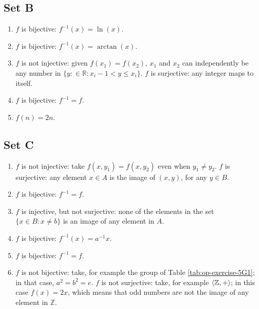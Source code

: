 \subsection{Set B}
\begin{enumerate}
    \item $f$ is bijective: $f^{-1}(x) = \ln(x)$.

    \item $f$ is bijective: $f^{-1}(x) = \arctan(x)$.

    \item $f$ is not injective: given $f(x_1) = f(x_2)$, $x_1$ and $x_2$ can independently be any number in $\{y: \in \mathbb{R}: x_i - 1 < y \leqslant x_i\}$. $f$ is surjective: any integer maps to itself.

    \item $f$ is bijective: $f^{-1} = f$.

    \item $f(n) = 2n$.
\end{enumerate}

\subsection{Set C}
\begin{enumerate}
    \item $f$ is not injective: take $f(x, y_1) = f(x, y_2)$ even when $y_1 \ne y_2$. $f$ is surjective: any element $x \in A$ is the image of $(x, y)$, for any $y \in B$.

    \item $f$ is bijective: $f^{-1} = f$.

    \item $f$ is injective, but not surjective: none of the elements in the set $\{x \in B: x \ne b\}$ is an image of any element in $A$.

    \item $f$ is bijective: $f^{-1}(x) = a^{-1}x$.

    \item $f$ is bijective: $f^{-1} = f$.

    \item $f$ is not bijective: take, for example the group of Table \ref{tab:op-exercise-5G1}; in that case, $a^2 = b^2 = e$. $f$ is not surjective: take, for example $\langle\mathbb{Z}, +\rangle$; in this case $f(x) = 2x$, which means that odd numbers are not the image of any element in $\mathbb{Z}$.
\end{enumerate}

